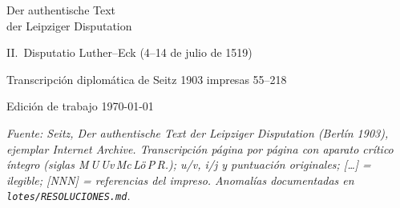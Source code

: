 \documentclass[11pt,a4paper,twoside]{article}
\begin{document}
\begin{titlepage}
\centering
{\LARGE Der authentische Text\\der Leipziger Disputation\par}
\vspace{1em}
{\large II.\ Disputatio Luther--Eck (4--14 de julio de 1519)\par}
\vspace{2em}
{\normalsize Transcripci\'on diplom\'atica de Seitz 1903 \textperiodcentered{} impresas 55--218\par}
\vfill
{\small Edici\'on de trabajo \textperiodcentered{} \today\par}
\end{titlepage}
\noindent\textit{Fuente: Seitz, Der authentische Text der Leipziger Disputation (Berl\'in 1903), ejemplar Internet Archive. Transcripci\'on p\'agina por p\'agina con aparato cr\'itico \'integro (siglas M\,U\,Uv\,Mc\,L\"o\,P\,R.); u/v, i/j y puntuaci\'on originales; [\dots] = ilegible; [NNN] = referencias del impreso. Anomal\'ias documentadas en \texttt{lotes/RESOLUCIONES.md}.}

\bigskip



\end{document}
